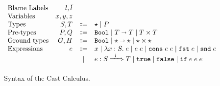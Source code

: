 \documentclass[runningheads]{llncs}
\newcommand{\infr}[2]{\inference{#1}{#2}}
\newcommand{\stxrule}[3]{\text{#2} & #1 & \Coloneqq & #3\\}
\newcommand{\stxrulecont}[1]{& & | & #1 \\}
\newcommand{\Tdyn}[0]{\ensuremath{\star}}
\newcommand{\Pbool}[0]{\ensuremath{\mathtt{Bool}}}
\newcommand{\Pfunc}[2]{\ensuremath{#1 \shortrightarrow #2}}
\newcommand{\Pprod}[2]{\ensuremath{#1 \times #2}}
\newcommand{\Gbool}[0]{\Pbool}
\newcommand{\Gfunc}[0]{\Pfunc{\Tdyn}{\Tdyn}}
\newcommand{\Gprod}[0]{\Pprod{\Tdyn}{\Tdyn}}
\newcommand{\evar}[1]{#1}
\newcommand{\elam}[3]{\lambda#1:#2.\;#3}
\newcommand{\eapp}[2]{#1\;#2}
\newcommand{\etrue}[0]{\mathtt{true}}
\newcommand{\efalse}[0]{\mathtt{false}}
\newcommand{\eif}[3]{\mathtt{if}\;#1\;#2\;#3}
\newcommand{\econs}[2]{\mathtt{cons} \; #1 \; #2}
\newcommand{\efst}[1]{\mathtt{fst} \; #1}
\newcommand{\esnd}[1]{\mathtt{snd} \; #1}
\newcommand{\ecast}[2]{\ensuremath{#1 : #2}}
\newcommand{\ccast}[3]{#1 \xRightarrow[]{\enskip #2 \enskip} #3}
\newcommand{\consistent}[2]{\ensuremath{#1\sim#2}}
\newcommand{\shallowlyconsistent}[2]{\ensuremath{#1\smile#2}}
\newcommand{\expressiontyping}[3]{\ensuremath{#1 \vdash #2 : #3}}
\begin{document}
\begin{figure}[t]
\[
\begin{array}{lrcl}
\text{Blame Labels} & l,\bar{l} \\
\text{Variables} & x,y,z \\
\stxrule{S,T}{Types}{
	\Tdyn \mid{}
	P
}
\stxrule{P,Q}{Pre-types}{
	\Pbool \mid
	\Pfunc{T}{T} \mid
	\Pprod{T}{T}
}
\stxrule{G,H}{Ground types}{
	\Gbool  \mid
	\Gfunc  \mid
	\Gprod
}
\stxrule{e}{Expressions}{
	\evar{x}        \mid
	\elam{x}{S}{e}  \mid
	\eapp{e}{e}     \mid
	\econs{e}{e}  \mid
	\efst{e}      \mid
	\esnd{e}
}
\stxrulecont{
	\ecast{e}{\ccast{S}{l}{T}}  \mid
	\etrue         \mid
	\efalse        \mid
	\eif{e}{e}{e}
}
\end{array}
\]
	
		



\caption{Syntax of the Cast Calculus.}
\label{fig:statics}
\end{figure}
\end{document}
